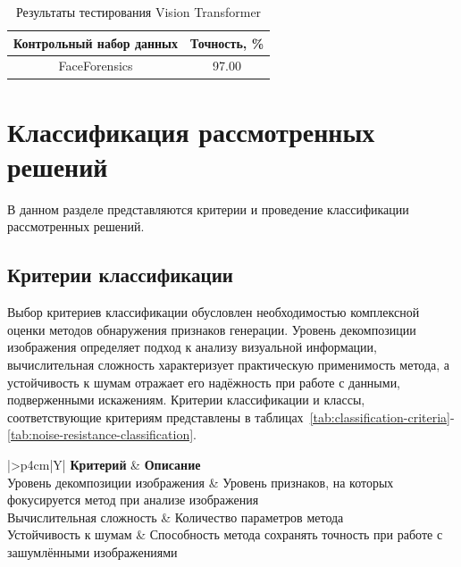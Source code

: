 \begin{table}[H]
	\centering
	\caption{Результаты тестирования Vision Transformer}
	\label{tbl:vit-results}
	\begin{tabular}{|c|c|}
		\hline
		\textbf{Контрольный набор данных} & \textbf{Точность, \%} \\
		\hline
		FaceForensics & 97.00 \\
		\hline
	\end{tabular}
\end{table}

\section{Классификация рассмотренных решений}

В данном разделе представляются критерии и проведение классификации рассмотренных решений.

\subsection{Критерии классификации}

Выбор критериев классификации обусловлен необходимостью комплексной оценки методов обнаружения признаков генерации. Уровень декомпозиции изображения определяет подход к анализу визуальной информации, вычислительная сложность характеризует практическую применимость метода, а устойчивость к шумам отражает его надёжность при работе с данными, подверженными искажениям. Критерии классификации и классы, соответствующие критериям представлены в таблицах~\ref{tab:classification-criteria}-\ref{tab:noise-resistance-classification}.

\begin{table}[H]
	\centering
	\caption{Критерии классификации методов обнаружения признаков генерации на изображении}
	\label{tab:classification-criteria}
	\begin{tabularx}{\textwidth}{|>{\centering\arraybackslash}p{4cm}|Y|}
		\hline
		\textbf{Критерий} & \textbf{Описание} \\
		\hline
		Уровень декомпозиции изображения & Уровень признаков, на которых фокусируется метод при анализе изображения \\
		\hline
		Вычислительная сложность & Количество параметров метода \\
		\hline
		Устойчивость к шумам & Способность метода сохранять точность при работе с зашумлёнными изображениями \\
		\hline
	\end{tabularx}
\end{table}

